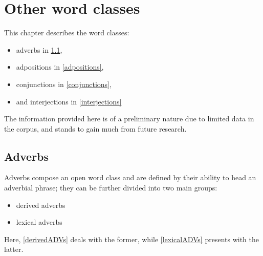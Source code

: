 

\chapter{Other word classes}\label{otherWordClasses}
This chapter describes the word classes:
\begin{itemize}
\item{adverbs in \SEC\ref{adverbs},}
\item{adpositions in \SEC\ref{adpositions},}
\item{conjunctions in \SEC\ref{conjunctions},}
\item{and interjections in \SEC\ref{interjections}}
\end{itemize}
The information provided here is of a preliminary nature due to limited data in the corpus, and stands to gain much from future research. %


\section{Adverbs}\label{adverbs}
Adverbs compose an open word class and are defined by their ability to head an adverbial phrase; they can be further divided into two main groups: 
\begin{itemize}
\item{derived adverbs}
\item{lexical adverbs}
\end{itemize}
Here, \SEC\ref{derivedADVs} deals with the former, while \SEC\ref{lexicalADVs} presents with the latter. 


